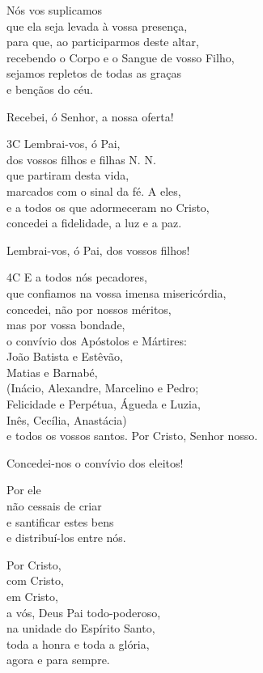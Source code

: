 \documentclass{book}
\begin{document}
\begin{flushleft}
    Nós vos suplicamos \\
    que ela seja levada à vossa presença, \\
    para que, ao participarmos deste altar, \\
    recebendo o Corpo e o Sangue de vosso Filho, \\
    sejamos repletos de todas as graças \\
    e bençãos do céu.

    Recebei, ó Senhor, a nossa oferta!

    3C Lembrai-vos, ó Pai, \\
    dos vossos filhos e filhas N. N. \\
    que partiram desta vida, \\
    marcados com o sinal da fé.
    A eles, \\
    e a todos os que adormeceram no Cristo, \\
    concedei a fidelidade, a luz e a paz.

    Lembrai-vos, ó Pai, dos vossos filhos!

    4C E a todos nós pecadores, \\
    que confiamos na vossa imensa misericórdia, \\
    concedei, não por nossos méritos, \\
    mas por vossa bondade, \\
    o convívio dos Apóstolos e Mártires: \\
    João Batista e Estêvão, \\
    Matias e Barnabé, \\
    (Inácio, Alexandre, Marcelino e Pedro; \\
    Felicidade e Perpétua, Águeda e Luzia, \\
    Inês, Cecília, Anastácia) \\
    e todos os vossos santos.
    Por Cristo, Senhor nosso.

    Concedei-nos o convívio dos eleitos!

    Por ele \\
    não cessais de criar \\
    e santificar estes bens \\
    e distribuí-los entre nós.

    Por Cristo, \\
    com Cristo, \\
    em Cristo, \\
    a vós, Deus Pai todo-poderoso, \\
    na unidade do Espírito Santo, \\
    toda a honra e toda a glória, \\
    agora e para sempre.


\end{flushleft}
\end{document}
